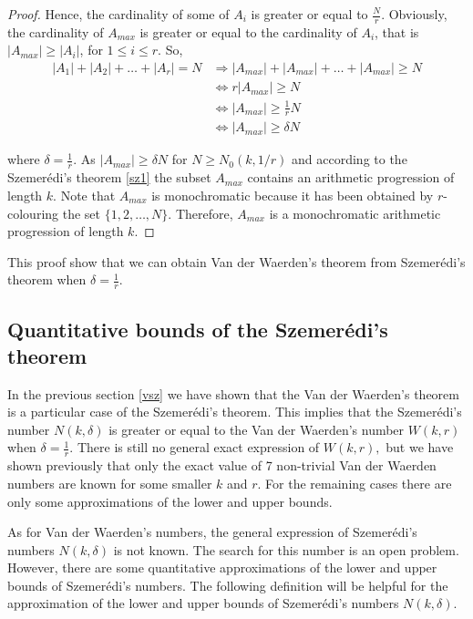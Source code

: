 \begin{proof}
Hence, the cardinality of some of $A_i$ is greater or equal to  $\frac{N}{r}.$ 
Obviously, the cardinality of $A_{max}$ is greater or equal to the cardinality of $A_i$, that is $|A_{max}| \geq |A_i|$, for $1\leq i \leq r.$ So,
\begin{align*}
|A_1|+|A_2|+ \ldots +|A_r|=N & \Longrightarrow |A_{max}|+|A_{max}|+ \ldots +|A_{max}| \geq N \\  & \Longleftrightarrow r|A_{max}| \geq N \\
&  \Longleftrightarrow |A_{max}| \geq \frac{1}{r} N \\ 
& \Longleftrightarrow |A_{max}| \geq \delta N\end{align*}

where $\delta = \frac{1}{r}$.
As $|A_{max}| \geq \delta N$ for $N \ge N_0(k, 1/r)$ and according to the Szemerédi's theorem \eqref{sz1} the subset $A_{max}$  contains an arithmetic progression of length $k.$
Note that $A_{max}$ is monochromatic because it has been obtained by $r$-colouring the set $\{1,2,\ldots, N\}.$ Therefore, $A_{max}$ is a monochromatic arithmetic progression of length $k.$
\end{proof}
This proof show that we can obtain Van der Waerden's theorem from   Szemerédi's theorem when $\delta= \frac{1}{r}.$


\subsection{Quantitative bounds of the  Szemerédi's theorem}

In the previous section \eqref{vsz} we have shown that the Van der Waerden's theorem is a particular case of the Szemerédi's theorem. This implies that the Szemerédi's number $N(k, \delta)$ is greater or equal to the Van der Waerden's number $W(k,r)$ when $\delta=\frac{1}{r}.$
There is still no  general exact expression of $W(k,r),$ but  we have shown previously that only the exact value of 7 non-trivial Van der Waerden numbers are known for some smaller $k$ and $r$. For the remaining cases there are only some  approximations of the lower and upper bounds. 

As for  Van der Waerden's numbers,  the general expression of Szemerédi's numbers $N(k, \delta)$ is not known. The search for this number is an open problem. However, there are some quantitative approximations of the lower and upper bounds of  Szemerédi's numbers.  The following definition will be helpful for the approximation of the lower and upper bounds of Szemerédi's numbers $N(k, \delta)$.

